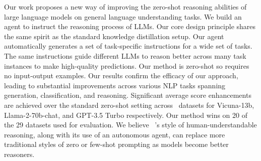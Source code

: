 \vspace{-5pt}
Our work proposes a new way of improving the zero-shot reasoning abilities of large language models on general language understanding tasks. We build an agent to instruct the reasoning process of LLMs. Our core design principle shares the same spirit as the standard knowledge distillation setup. Our agent automatically generates a set of task-specific instructions for a wide set of tasks. The same instructions guide different LLMs to reason better across many task instances to make high-quality predictions. Our method is zero-shot so requires no input-output examples. Our results confirm the efficacy of our approach, leading to substantial improvements across various NLP tasks spanning generation, classification, and reasoning. Significant average score enhancements are achieved over the standard zero-shot setting across \NumDatasets\ datasets for Vicuna-13b, Llama-2-70b-chat, and GPT-3.5 Turbo respectively. Our method wins on 20 of the 29 datasets used for evaluation. We believe \zeroshotmid\ \method's style of human-understandable reasoning, along with its use of an autonomous agent, can replace more traditional styles of zero or few-shot prompting as models become better reasoners.
